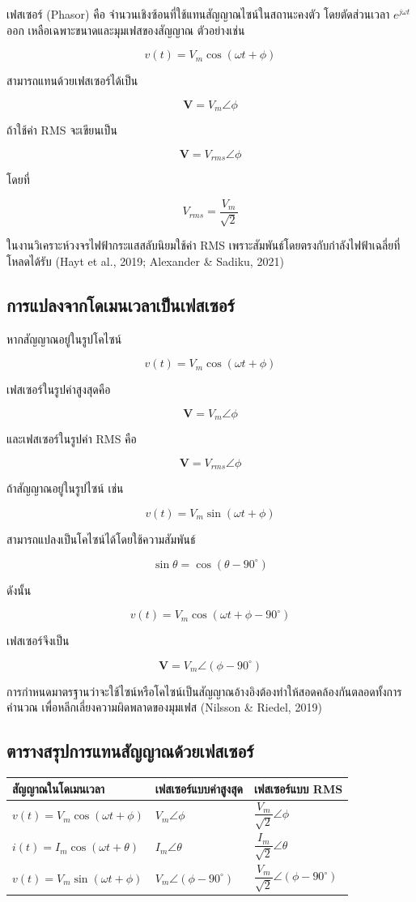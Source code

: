 เฟสเซอร์ (Phasor) คือ จำนวนเชิงซ้อนที่ใช้แทนสัญญาณไซน์ในสถานะคงตัว โดยตัดส่วนเวลา $e^{j\omega t}$ ออก เหลือเฉพาะขนาดและมุมเฟสของสัญญาณ ตัวอย่างเช่น

\[
v(t)=V_m\cos(\omega t+\phi)
\]

สามารถแทนด้วยเฟสเซอร์ได้เป็น

\[
\mathbf{V}=V_m\angle\phi
\]

ถ้าใช้ค่า RMS จะเขียนเป็น

\[
\mathbf{V}=V_{rms}\angle\phi
\]

โดยที่

\[
V_{rms}=\frac{V_m}{\sqrt{2}}
\]

ในงานวิเคราะห์วงจรไฟฟ้ากระแสสลับนิยมใช้ค่า RMS เพราะสัมพันธ์โดยตรงกับกำลังไฟฟ้าเฉลี่ยที่โหลดได้รับ (Hayt et al., 2019; Alexander \& Sadiku, 2021)

\subsection{การแปลงจากโดเมนเวลาเป็นเฟสเซอร์}

หากสัญญาณอยู่ในรูปโคไซน์

\[
v(t)=V_m\cos(\omega t+\phi)
\]

เฟสเซอร์ในรูปค่าสูงสุดคือ

\[
\mathbf{V}=V_m\angle\phi
\]

และเฟสเซอร์ในรูปค่า RMS คือ

\[
\mathbf{V}=V_{rms}\angle\phi
\]

ถ้าสัญญาณอยู่ในรูปไซน์ เช่น

\[
v(t)=V_m\sin(\omega t+\phi)
\]

สามารถแปลงเป็นโคไซน์ได้โดยใช้ความสัมพันธ์

\[
\sin\theta=\cos(\theta-90^\circ)
\]

ดังนั้น

\[
v(t)=V_m\cos(\omega t+\phi-90^\circ)
\]

เฟสเซอร์จึงเป็น

\[
\mathbf{V}=V_m\angle(\phi-90^\circ)
\]

การกำหนดมาตรฐานว่าจะใช้ไซน์หรือโคไซน์เป็นสัญญาณอ้างอิงต้องทำให้สอดคล้องกันตลอดทั้งการคำนวณ เพื่อหลีกเลี่ยงความผิดพลาดของมุมเฟส (Nilsson \& Riedel, 2019)

\subsection{ตารางสรุปการแทนสัญญาณด้วยเฟสเซอร์}

\begin{longtable}{L{0.37\textwidth}L{0.27\textwidth}L{0.27\textwidth}}
\toprule
\textbf{สัญญาณในโดเมนเวลา} & \textbf{เฟสเซอร์แบบค่าสูงสุด} & \textbf{เฟสเซอร์แบบ RMS} \\
\midrule
$v(t)=V_m\cos(\omega t+\phi)$ & $V_m\angle\phi$ & $\dfrac{V_m}{\sqrt{2}}\angle\phi$ \\
$i(t)=I_m\cos(\omega t+\theta)$ & $I_m\angle\theta$ & $\dfrac{I_m}{\sqrt{2}}\angle\theta$ \\
$v(t)=V_m\sin(\omega t+\phi)$ & $V_m\angle(\phi-90^\circ)$ & $\dfrac{V_m}{\sqrt{2}}\angle(\phi-90^\circ)$ \\
\bottomrule
\end{longtable}

